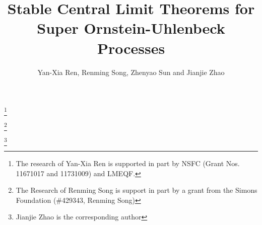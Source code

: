 \documentclass[12pt,a4paper]{amsart}
\theoremstyle{plain}
\theoremstyle{definition}
\numberwithin{equation}{section}
\begin{document}
\title
[stable CLT for super-OU processes]
{Stable Central Limit Theorems for Super Ornstein-Uhlenbeck Processes}
\author
[Y.-X. Ren, R. Song, Z. Sun and J. Zhao]
{Yan-Xia Ren, Renming Song, Zhenyao Sun and Jianjie Zhao}
\address{
  Yan-Xia Ren \\
  LMAM School of Mathematical Sciences \& Center for Statistical Science \\
  Peking University \\
  Beijing, P. R. China, 100871}
\thanks{The research of Yan-Xia Ren is supported in part by NSFC (Grant Nos. 11671017  and 11731009) and LMEQF.}
\address{
  Renming Song \\
  Department of Mathematics \\
  University of Illinois at Urbana-Champaign \\
  Urbana, IL, USA, 61801}
\thanks{The Research of Renming Song is support in part by a grant from the Simons Foundation (\#429343, Renming Song)}
\address{
  Zhenyao Sun \\
  School of Mathematics and Statistics\\
  Wuhan University \\
  Hubei, P. R. China, 100871}
\address{
  Jianjie Zhao \\
  School of Mathematical Sciences \\
  Peking University \\
  Beijing, P. R. China, 100871}
\thanks{Jianjie Zhao is the corresponding author}
\end{document}
